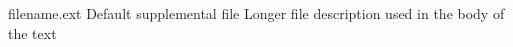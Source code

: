 \documentclass[../main.tex]{subfiles}%
\begin{document}
%
    \Xsupplement%
    \begin{supplement}%
        \supplementcaption%
            {filename.ext}%
            {Default supplemental file}%
            {Longer file description used in the body of the text}%
        \label{sup:default}%
    \end{supplement}%
\end{document}
